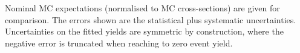 \begin{table}
{%
Nominal MC expectations (normalised to MC cross-sections) are given for comparison. 
The errors shown are the statistical plus systematic uncertainties.
Uncertainties on the fitted yields are symmetric by construction, 
where the negative error is truncated when reaching to zero event yield.
}
\label{table.results.yields.fit.SRMMEM}
\end{table}
%